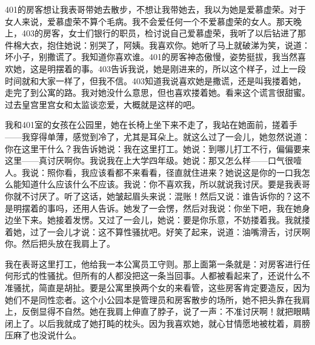 401的房客想让我表哥带她去散步，不想让我带她去，我以为她是爱慕虚荣。对于女人来说，爱慕虚荣不算个毛病。我不会爱任何一个不爱慕虚荣的女人。那天晚上，403的房客，女士们银行的职员，检讨说自己爱慕虚荣，我听了以后钻进了那件棉大衣，抱住她说：别哭了，阿姨。我喜欢你。她听了马上就破涕为笑，说道：坏小子，别撒谎了。我知道你喜欢谁。401的房客神态傲慢，姿势挺拔，我当然喜欢她，这是明摆着的事。403告诉我说，她是刚进来的，所以这个样子，过上一段时间就和大家一样了，但我不信。403知道我说喜欢她是撒谎，还是叫我搂着她，走完了到公寓的路。我对她没什么意思，但也喜欢搂着她。看来这个谎言很甜蜜。过去皇宫里宫女和太监谈恋爱，大概就是这样的吧。 

我和401室的女孩在公园里，她在长椅上坐下来不走了，我站在她面前，搓着手——我穿得单薄，感觉到冷了，尤其是耳朵上。就这么过了一会儿，她忽然说道：你在这里干什么？我告诉她说：我在这里打工。她说：到哪儿打工不行，偏偏要来这里——真讨厌啊你。我说我在上大学四年级。她说：那又怎么样——口气很噎人。我说：照你看，我应该看都不来看看，径直就住进来？她说这是你的一口我怎么能知道什么应该什么不应该。我说：你不喜欢我，所以就说我讨厌。要是我表哥你就不讨厌了。听了这话，她皱起眉头来说：混账！然后又说：谁告诉你的？这不是明摆着的事吗，还用人告诉。她发了一会愣，然后对我说：你坐下吧，我在她身边坐下来。她接着发愣。又过了一会儿，她说：要是你乐意，不妨搂着我。我就搂着她，过了一会儿才说：这不算性骚扰吧。好笑了起来，说道：油嘴滑舌，讨厌啊你。然后把头放在我肩上了。 

我在表哥这里打工，他给我一本公寓员工守则。那上面第一条就是：对房客进行任何形式的性骚扰。但所有的人都没把这一条当回事。人都被看起来了，还说什么不准骚扰，简直是胡扯。要是公寓里换两个女的来看管，这些房客肯定要造反，因为她们不是同性恋者。这个小公园本是管理员和房客散步的场所，她不把头靠在我肩上，反倒显得不自然。她在我肩上伸直了脖子，说了一声：不准讨厌啊！就把眼睛闭上了。以后我就成了她打盹的枕头。因为我喜欢她，就心甘情愿地被枕着，肩膀压麻了也没说什么。 

